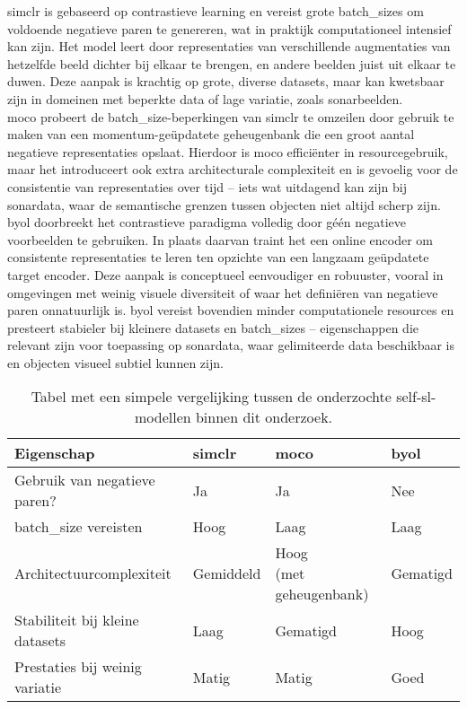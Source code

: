\gls{simclr} is gebaseerd op contrastieve learning en vereist grote \glspl{batch_size} om voldoende negatieve paren te genereren, wat in praktijk computationeel intensief kan zijn. Het model leert door representaties van verschillende augmentaties van hetzelfde beeld dichter bij elkaar te brengen, en andere beelden juist uit elkaar te duwen. Deze aanpak is krachtig op grote, diverse datasets, maar kan kwetsbaar zijn in domeinen met beperkte data of lage variatie, zoals sonarbeelden. \\

\gls{moco} probeert de \gls{batch_size}-beperkingen van \gls{simclr} te omzeilen door gebruik te maken van een momentum-geüpdatete geheugenbank die een groot aantal negatieve representaties opslaat. Hierdoor is \gls{moco} efficiënter in resourcegebruik, maar het introduceert ook extra architecturale complexiteit en is gevoelig voor de consistentie van representaties over tijd -- iets wat uitdagend kan zijn bij sonardata, waar de semantische grenzen tussen objecten niet altijd scherp zijn. \\

\gls{byol} doorbreekt het contrastieve paradigma volledig door géén negatieve voorbeelden te gebruiken. In plaats daarvan traint het een online encoder om consistente representaties te leren ten opzichte van een langzaam geüpdatete target encoder. Deze aanpak is conceptueel eenvoudiger en robuuster, vooral in omgevingen met weinig visuele diversiteit of waar het definiëren van negatieve paren onnatuurlijk is. \gls{byol} vereist bovendien minder computationele resources en presteert stabieler bij kleinere datasets en \glspl{batch_size} -- eigenschappen die relevant zijn voor toepassing op sonardata, waar gelimiteerde data beschikbaar is en objecten visueel subtiel kunnen zijn.

\begin{table}[H]
    \centering
    \begin{tabular}{llll}
        \toprule
        \textbf{Eigenschap} & \textbf{\acrshort{simclr}} & \textbf{\acrshort{moco}} & \textbf{\acrshort{byol}} \\
        \midrule
        Gebruik van negatieve paren?        & Ja        & Ja                        & Nee \\
        \Gls{batch_size} vereisten          & Hoog      & Laag                      & Laag \\
        Architectuurcomplexiteit            & Gemiddeld & \makecell[l]{Hoog \\ (met geheugenbank)}   & Gematigd \\
        Stabiliteit bij kleine datasets     & Laag      & Gematigd                  & Hoog \\
        Prestaties bij weinig variatie      & Matig     & Matig                     & Goed \\
        \bottomrule
    \end{tabular}
    \caption[Vergelijking self-supervised modellen]{\label{tab:comparison_self_sl_models} Tabel met een simpele vergelijking tussen de onderzochte \gls{self-sl}-modellen binnen dit onderzoek.}
\end{table}
